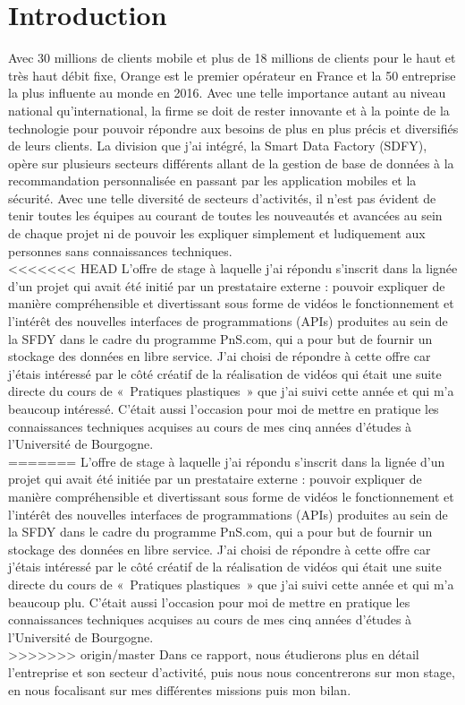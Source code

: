 \chapter*{Introduction}
\label{chap:introduction}

Avec 30 millions de clients mobile et plus de 18 millions de clients  pour le haut et très haut débit fixe, Orange est le premier opérateur en France et la 50 entreprise la plus influente au monde en 2016. Avec une telle importance autant au niveau national qu'international, la firme se doit de rester innovante et à la pointe de la technologie pour pouvoir répondre aux besoins de plus en plus précis et diversifiés de leurs clients. La division que j’ai intégré, la Smart Data Factory (SDFY), opère sur plusieurs secteurs différents allant de la gestion de base de données à la recommandation personnalisée en passant par les application mobiles et la sécurité. Avec une telle diversité de secteurs d’activités, il n’est pas évident de tenir toutes les équipes au courant de toutes les nouveautés et avancées au sein de chaque projet ni de pouvoir les expliquer simplement et ludiquement aux personnes sans connaissances techniques.\\
<<<<<<< HEAD
L’offre de stage à laquelle j’ai répondu s’inscrit dans la lignée d’un projet qui avait été initié par un prestataire externe : pouvoir expliquer de manière compréhensible et divertissant sous forme de vidéos le fonctionnement et l’intérêt des nouvelles  interfaces de programmations (APIs) produites au sein de la SFDY dans le cadre du programme PnS.com, qui a pour but de fournir un stockage des données en libre service. J’ai choisi de répondre à cette offre car j’étais intéressé par le côté créatif de la réalisation de vidéos qui était une suite directe du cours de « Pratiques plastiques » que j’ai suivi cette année et qui m’a beaucoup intéressé. C’était aussi l’occasion pour moi de mettre en pratique les connaissances techniques acquises au cours de mes cinq années d'études à l’Université de Bourgogne.\\
=======
L’offre de stage à laquelle j’ai répondu s’inscrit dans la lignée d’un projet qui avait été initiée par un prestataire externe : pouvoir expliquer de manière compréhensible et divertissant sous forme de vidéos le fonctionnement et l’intérêt des nouvelles  interfaces de programmations (APIs) produites au sein de la SFDY dans le cadre du programme PnS.com, qui a pour but de fournir un stockage des données en libre service. J’ai choisi de répondre à cette offre car j’étais intéressé par le côté créatif de la réalisation de vidéos qui était une suite directe du cours de « Pratiques plastiques » que j’ai suivi cette année et qui m’a beaucoup plu. C’était aussi l’occasion pour moi de mettre en pratique les connaissances techniques acquises au cours de mes cinq années d'études à l’Université de Bourgogne.\\
>>>>>>> origin/master
Dans ce rapport, nous étudierons plus en détail l’entreprise et son secteur d’activité, puis nous nous concentrerons sur mon stage, en nous focalisant sur mes différentes missions puis mon bilan.
